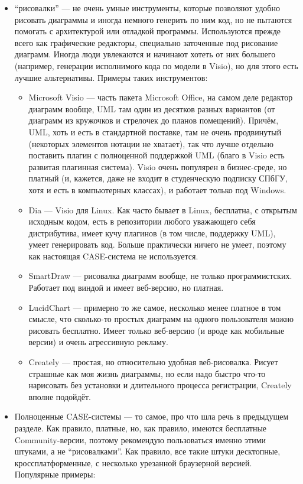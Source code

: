 \documentclass[a5paper]{article}
\begin{document}
\begin{itemize}
	\item ``рисовалки'' --- не очень умные инструменты, которые позволяют удобно рисовать диаграммы и иногда немного генерить по ним код, но не пытаются помогать с архитектурой или отладкой программы. Используются прежде всего как графические редакторы, специально заточенные под рисование диаграмм. Иногда люди увлекаются и начинают хотеть от них большего (например, генерации исполнимого кода по модели в Visio), но для этого есть лучшие альтернативы. Примеры таких инструментов:
	\begin{itemize}
		\item Microsoft Visio --- часть пакета Microsoft Office, на самом деле редактор диаграмм вообще, UML там один из десятков разных вариантов (от диаграмм из кружочков и стрелочек до планов помещений). Причём, UML, хоть и есть в стандартной поставке, там не очень продвинутый (некоторых элементов нотации не хватает), так что лучше отдельно поставить плагин с полноценной поддержкой UML (благо в Visio есть развитая плагинная система). Visio очень популярен в бизнес-среде, но платный (и, кажется, даже не входит в студенческую подписку СПбГУ, хотя и есть в компьютерных классах), и работает только под Windows.
		\item Dia --- Visio для Linux. Как часто бывает в Linux, бесплатна, с открытым исходным кодом, есть в репозитории любого уважающего себя дистрибутива, имеет кучу плагинов (в том числе, поддержку UML), умеет генерировать код. Больше практически ничего не умеет, поэтому как настоящая CASE-система не используется.
		\item SmartDraw --- рисовалка диаграмм вообще, не только программистских. Работает под виндой и имеет веб-версию, но платная.
		\item LucidChart --- примерно то же самое, несколько менее платное в том смысле, что сколько-то простых диаграмм на одного пользователя можно рисовать бесплатно. Имеет только веб-версию (и вроде как мобильные версии) и очень агрессивную рекламу.
		\item Creately --- простая, но относительно удобная веб-рисовалка. Рисует страшные как моя жизнь диаграммы, но если надо быстро что-то нарисовать без установки и длительного процесса регистрации, Creately вполне подойдёт.
	\end{itemize}
	\item Полноценные CASE-системы --- то самое, про что шла речь в предыдущем разделе. Как правило, платные, но, как правило, имеются бесплатные Community-версии, поэтому рекомендую пользоваться именно этими штуками, а не ``рисовалками''. Как правило, все такие штуки десктопные, кроссплатформенные, с несколько урезанной браузерной версией. Популярные примеры:

\end{itemize}
\end{document}
